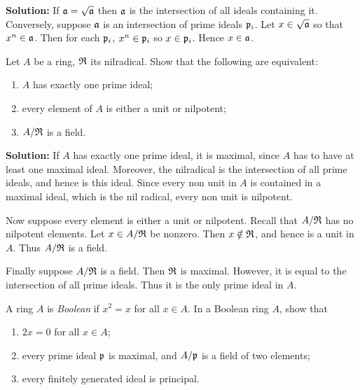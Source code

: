 \documentclass{article}
\begin{document}
\noindent\textbf{Solution:}
If \(\mathfrak{a} = \sqrt{\mathfrak{a}}\) then \(\mathfrak{a}\) is the intersection of all ideals containing it.
Conversely, suppose \(\mathfrak{a}\) is an intersection of prime ideals \(\mathfrak{p}_i\).
Let \(x \in \sqrt{\mathfrak{a}}\) so that \(x^n \in \mathfrak{a}\).
Then for each \(\mathfrak{p}_i\), \(x^n \in \mathfrak{p}_i\) so \(x \in \mathfrak{p}_i\).
Hence \(x \in \mathfrak{a}\).

\begin{exercise}
    Let \(A\) be a ring, \(\mathfrak{R}\) its nilradical.
    Show that the following are equivalent:
    \begin{enumerate}
        \item
            \(A\) has exactly one prime ideal;
        \item
            every element of \(A\) is either a unit or nilpotent;
        \item
            \(A/\mathfrak{R}\) is a field.
    \end{enumerate}
\end{exercise}

\noindent\textbf{Solution:}
If \(A\) has exactly one prime ideal, it is maximal, since \(A\) has to have at least one maximal ideal.
Moreover, the nilradical is the intersection of all prime ideals, and hence is this ideal.
Since every non unit in \(A\) is contained in a maximal ideal, which is the nil radical, every non unit is nilpotent.

Now suppose every element is either a unit or nilpotent.
Recall that \(A/\mathfrak{R}\) has no nilpotent elements.
Let \(x \in A/\mathfrak{R}\) be nonzero.
Then \(x \notin \mathfrak{R}\), and hence is a unit in \(A\).
Thus \(A/\mathfrak{R}\) is a field.

Finally suppose \(A/\mathfrak{R}\) is a field.
Then \(\mathfrak{R}\) is maximal.
However, it is equal to the intersection of all prime ideals.
Thus it is the only prime ideal in \(A\).

\begin{exercise} \label{ex1-11}
    A ring \(A\) is \textit{Boolean} if \(x^2 = x\) for all \(x \in A\).
    In a Boolean ring \(A\), show that
    \begin{enumerate}
        \item
            \(2x = 0\) for all \(x \in A\);
        \item
            every prime ideal \(\mathfrak{p}\) is maximal, and \(A/\mathfrak{p}\) is a field of two elements;
        \item
            every finitely generated ideal is principal.
    \end{enumerate}
\end{exercise}
\end{document}
